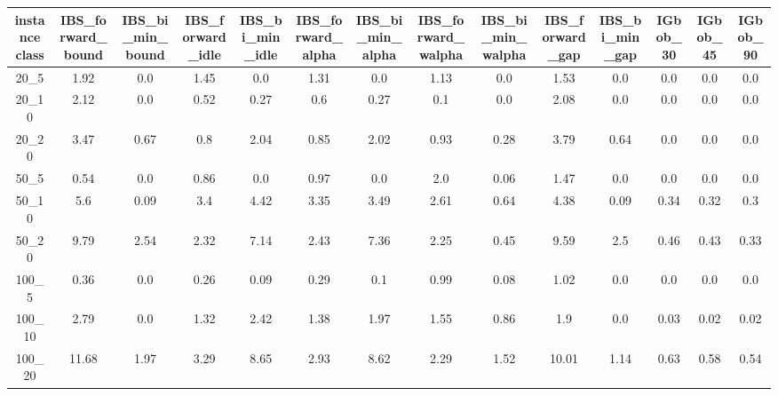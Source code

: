 \begin{tabular}{c|ccccccccccccc}
instance class & IBS\_forward\_bound & IBS\_bi\_min\_bound & IBS\_forward\_idle & IBS\_bi\_min\_idle & IBS\_forward\_alpha & IBS\_bi\_min\_alpha & IBS\_forward\_walpha & IBS\_bi\_min\_walpha & IBS\_forward\_gap & IBS\_bi\_min\_gap & IGbob\_30 & IGbob\_45 & IGbob\_90 \\ 
\hline
20\_5        & 1.92         & 0.0          & 1.45         & 0.0          & 1.31         & 0.0          & 1.13         & 0.0          & 1.53         & 0.0          & 0.0          & 0.0          & 0.0          \\ 
20\_10       & 2.12         & 0.0          & 0.52         & 0.27         & 0.6          & 0.27         & 0.1          & 0.0          & 2.08         & 0.0          & 0.0          & 0.0          & 0.0          \\ 
20\_20       & 3.47         & 0.67         & 0.8          & 2.04         & 0.85         & 2.02         & 0.93         & 0.28         & 3.79         & 0.64         & 0.0          & 0.0          & 0.0          \\ 
50\_5        & 0.54         & 0.0          & 0.86         & 0.0          & 0.97         & 0.0          & 2.0          & 0.06         & 1.47         & 0.0          & 0.0          & 0.0          & 0.0          \\ 
50\_10       & 5.6          & 0.09         & 3.4          & 4.42         & 3.35         & 3.49         & 2.61         & 0.64         & 4.38         & 0.09         & 0.34         & 0.32         & 0.3          \\ 
50\_20       & 9.79         & 2.54         & 2.32         & 7.14         & 2.43         & 7.36         & 2.25         & 0.45         & 9.59         & 2.5          & 0.46         & 0.43         & 0.33         \\ 
100\_5       & 0.36         & 0.0          & 0.26         & 0.09         & 0.29         & 0.1          & 0.99         & 0.08         & 1.02         & 0.0          & 0.0          & 0.0          & 0.0          \\ 
100\_10      & 2.79         & 0.0          & 1.32         & 2.42         & 1.38         & 1.97         & 1.55         & 0.86         & 1.9          & 0.0          & 0.03         & 0.02         & 0.02         \\ 
100\_20      & 11.68        & 1.97         & 3.29         & 8.65         & 2.93         & 8.62         & 2.29         & 1.52         & 10.01        & 1.14         & 0.63         & 0.58         & 0.54         \\ 

\end{tabular}
